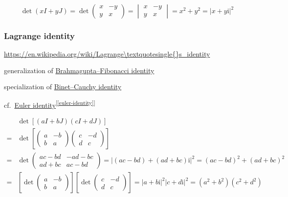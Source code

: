 \documentclass[
]{book}
\theoremstyle{definition}
\theoremstyle{definition}
\theoremstyle{definition}
\theoremstyle{definition}
\theoremstyle{remark}
\begin{document}
\[
\det\left(xI+yJ\right)=\det\begin{pmatrix}x & -y\\
y & x
\end{pmatrix}=\begin{vmatrix}x & -y\\
y & x
\end{vmatrix}=x^{2}+y^{2}=\left|x+y\mathrm{i}\right|^{2}
\]

\hypertarget{lagrange-identity}{%
\subsubsection{Lagrange identity}\label{lagrange-identity}}

\url{https://en.wikipedia.org/wiki/Lagrange\textquotesingle{}s_identity}

generalization of \href{https://en.wikipedia.org/wiki/Lagrange\textquotesingle{}s_identity}{Brahmagupta--Fibonacci identity}

specialization of \href{https://en.wikipedia.org/wiki/Binet–Cauchy_identity}{Binet--Cauchy identity}

cf.~\protect\hyperlink{euler-identity}{Euler identity}\textsuperscript{{[}\ref{euler-identity}{]}}

\[
\begin{aligned}
 & \det\left[\left(aI+bJ\right)\left(cI+dJ\right)\right]\\
= & \det\left[\begin{pmatrix}a & -b\\
b & a
\end{pmatrix}\begin{pmatrix}c & -d\\
d & c
\end{pmatrix}\right]\\
= & \det\begin{pmatrix}ac-bd & -ad-bc\\
ad+bc & ac-bd
\end{pmatrix}=\left|\left(ac-bd\right)+\left(ad+bc\right)\mathrm{i}\right|^{2}=\left(ac-bd\right)^{2}+\left(ad+bc\right)^{2}\\
= & \left[\det\begin{pmatrix}a & -b\\
b & a
\end{pmatrix}\right]\left[\det\begin{pmatrix}c & -d\\
d & c
\end{pmatrix}\right]=\left|a+b\mathrm{i}\right|^{2}\left|c+d\mathrm{i}\right|^{2}=\left(a^{2}+b^{2}\right)\left(c^{2}+d^{2}\right)
\end{aligned}
\]
\end{document}
